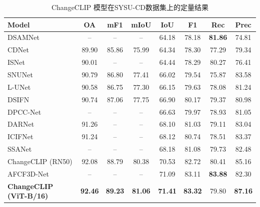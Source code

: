 \begin{table}[!htbp]
  \centering
  \caption{ChangeCLIP 模型在SYSU-CD数据集上的定量结果}
  \label{tab:changeclip_sysu}
  \begin{tabular*}{\textwidth}{@{\extracolsep{\fill}} l c c c c c c c}
    \toprule
    Model & OA & mF1 & mIoU & IoU & F1 & Rec & Prec \\
    \midrule
    DSAMNet~\cite{shi_deeply_2022}                   & --    & --    & --    & 64.18 & 78.18 & \textbf{81.86} & 74.81 \\
    CDNet~\cite{Alcantarilla2016StreetviewCD}                     & 89.90 & 85.86 & 75.99 & 64.34 & 78.30 & 77.29 & 79.34 \\
    ISNet~\cite{Cheng2022ISNetTI}                     & 90.01 & --    & --    & 64.44 & 78.29 & 80.27 & 76.41 \\
    SNUNet~\cite{Fang2021SNUNetCDAD}                    & 90.79 & 86.80 & 77.41 & 66.02 & 79.54 & 75.87 & 83.58 \\
    L-UNet~\cite{Papadomanolaki2021ADM}                    & 90.58 & 86.75 & 77.30 & 66.15 & 79.63 & 78.08 & 81.24 \\
    DSIFN~\cite{Zhang2020ADS}                       & 90.74 & 87.06 & 77.75 & 66.90 & 80.17 & 79.37 & 80.98 \\
    DPCC-Net~\cite{Papadomanolaki2021ADM}                  & --    & --    & --    & 66.63 & 79.97 & 78.93 & 81.05 \\
    DARNet~\cite{li_densely_2022}                    & 91.26 & --    & --    & 68.10 & 81.03 & 79.11 & 83.04 \\
    ICIFNet~\cite{Feng2022ICIFNetIC}                   & 91.24 & --    & --    & 68.12 & 80.74 & 78.51 & 83.37 \\
    SSANet~\cite{Jiang2022JointVL}                    & --    & --    & --    & 68.18 & 81.08 & 79.73 & 82.48 \\
    ChangeCLIP (RN50)         & 92.08 & 88.79 & 80.38 & 70.53 & 82.72 & 80.41 & 85.16 \\
    AFCF3D-Net~\cite{Ye2023AdjacentLevelFC}                & --    & --    & --    & 71.09 & 83.11 & \textbf{83.88} & 82.30 \\
    \textbf{ChangeCLIP (ViT-B/16)} & \textbf{92.46} & \textbf{89.23} & \textbf{81.06} & \textbf{71.41} & \textbf{83.32} & 79.80 & \textbf{87.16} \\
    \bottomrule
  \end{tabular*}
\end{table}

